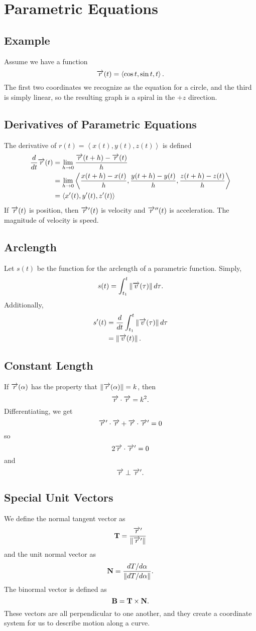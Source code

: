 \documentclass[12pt]{article}
\theoremstyle{plain} %
\theoremstyle{definition}
\theoremstyle{definition}
\theoremstyle{definition}
\theoremstyle{remark}
\newcommand{\vecv}{\vv{v}}
\newcommand{\vecr}{\vv{r}}
\newcommand{\angled}[1]{\left\langle {#1} \right\rangle}
\newcommand*{\vv}[1]{\overrightarrow{\mkern0mu#1}}
\renewcommand{\norm}[1]{\left\lVert#1\right\rVert}
\begin{document}
\section{Parametric Equations}
\subsection{Example}
Assume we have a function
\[ \vv{r}(t) = \angled{\cos{t},\sin{t},t}. \]
The first two coordinates we recognize as the equation for a circle, and the third is simply linear, so the resulting graph is a spiral in the $+z$ direction.
\subsection{Derivatives of Parametric Equations}
The derivative of $r(t) = \angled{x(t),y(t),z(t)}$ is defined
\begin{align*}
\frac{d}{dt} \vv{r}(t) &= \lim_{h \rightarrow 0} \frac{\vv{r}(t+h)-\vv{r}(t)}{h} \\
& = \lim_{h \rightarrow 0} \angled{\frac{x(t+h)-x(t)}{h},\frac{y(t+h)-y(t)}{h},\frac{z(t+h)-z(t)}{h}} \\
& = \angled{x^\prime(t),y^\prime(t),z^\prime(t)}
\end{align*}
If $\vecr(t)$ is position, then $\vecr^\prime(t)$ is velocity and $\vecr^{\prime\prime}(t)$ is acceleration. The magnitude of velocity is speed.

\subsection{Arclength}
Let $s(t)$ be the function for the arclength of a parametric function. Simply,
\[ s(t) = \int_{t_1}^t{\norm{\vecv(\tau)}d\tau}. \]
Additionally,
\begin{align*}
s^\prime(t) & = \frac{d}{dt} \int_{t_1}^t{\norm{\vecv(\tau)}d\tau} \\
& = \norm{\vecv(t)}.
\end{align*}

\subsection{Constant Length}
If $\vecr(\alpha)$ has the property that $\norm{\vecr(\alpha)} = k$, then
\[ \vecr \cdot \vecr = k^2.\]
Differentiating, we get
\[ \vecr^\prime \cdot \vecr + \vecr \cdot \vecr^\prime = 0 \]
so
\[ 2 \vecr \cdot \vecr^\prime = 0 \]
and
\[ \vecr \perp \vecr^\prime.\]

\subsection{Special Unit Vectors}
We define the normal tangent vector as \[\vb{T} = \frac{\vecr^\prime}{\norm{\vecr^\prime}}\] and the unit normal vector as \[\vb{N} = \frac{dT/d\alpha}{\norm{dT/d\alpha}}.\]
The binormal vector is defined as \[\vb{B} = \vb{T} \times \vb{N}. \]
These vectors are all perpendicular to one another, and they create a coordinate system for us to describe motion along a curve.
\end{document}

